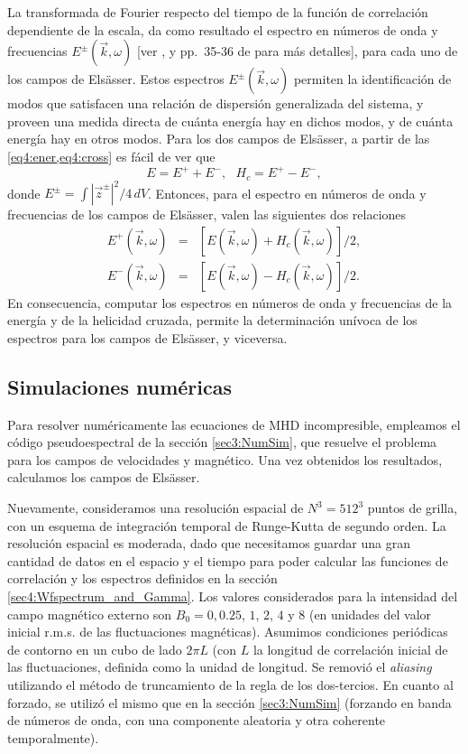 La transformada de Fourier respecto del tiempo de la función de
correlación dependiente de la escala, da como resultado el espectro en
números de onda y frecuencias $E^\pm(\vec{k},\omega)$
[ver \cite{clark_di_leoni_quantification_2014,
  clark_di_leoni_spatio-temporal_2015}, y pp.~35-36 de  
\cite{batchelor_theory_1953} para más detalles], para cada uno de los campos de
Els\"asser. Estos espectros $E^\pm(\vec{k},\omega)$ permiten la
identificación de modos que satisfacen una relación de dispersión
generalizada del sistema, y proveen una medida directa de cuánta
energía hay en dichos modos, y de cuánta energía hay en otros
modos. Para los dos campos de Els\"asser, a partir de
las \cref{eq4:ener,eq4:cross} es fácil de ver que
\begin{equation}
  E = E^+ + E^- , \,\,\,\, H_c = E^+ - E^- ,
\end{equation}
donde $E^\pm = \int |\vec{z}^\pm|^2/4 \, dV$. Entonces, para el
espectro en números de onda y frecuencias de los campos de Els\"asser,
valen las siguientes dos relaciones
\begin{eqnarray}
  E^+(\vec{k},\omega) &=& [E(\vec{k},\omega) + H_c(\vec{k},\omega)]/2, \\
  E^-(\vec{k},\omega) &=& [E(\vec{k},\omega) - H_c(\vec{k},\omega)]/2.
\end{eqnarray}
En consecuencia, computar los espectros en números de onda y
frecuencias de la energía y de la helicidad cruzada, permite la
determinación unívoca de los espectros para los campos de Els\"asser,
y viceversa.


\subsection{Simulaciones numéricas}\label{sec4:NumSim}

Para resolver numéricamente las ecuaciones de MHD incompresible,
empleamos el código pseudoespectral de la sección \ref{sec3:NumSim}, que
resuelve el problema para los campos de velocidades y magnético. Una
vez obtenidos los resultados, calculamos los campos de Els\"asser.

Nuevamente, consideramos una resolución espacial de $N^3 = 512^3$
puntos de grilla, con un esquema de integración temporal de
Runge-Kutta de segundo orden. La resolución espacial es moderada, dado
que necesitamos guardar una gran cantidad de datos en el espacio y el
tiempo para poder calcular las funciones de correlación y los
espectros definidos en la sección
\ref{sec4:Wfspectrum_and_Gamma}. Los valores considerados para la
intensidad del campo magnético externo son $B_0 = 0, 0.25$, $1$, $2$,
$4$ y $8$ (en unidades del valor inicial r.m.s. de las fluctuaciones
magnéticas). Asumimos condiciones periódicas de contorno en un cubo de
lado $2\pi L$ (con $L$ la longitud de correlación inicial de las
fluctuaciones, definida como la unidad de longitud. Se removió el
\textit{aliasing} utilizando el método de truncamiento de la regla de
los dos-tercios. En cuanto al forzado, se utilizó el mismo que en
la sección \ref{sec3:NumSim} (forzando en banda de números de onda, con una
componente aleatoria y otra coherente temporalmente).



